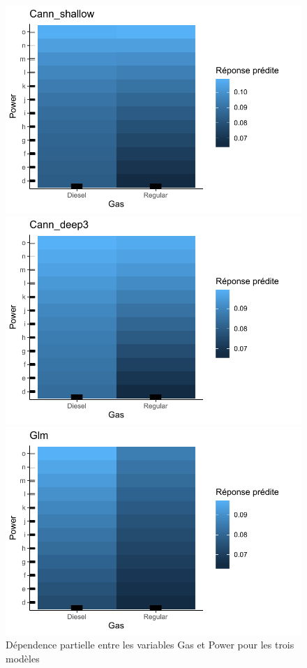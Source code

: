 \begin{figure}[b]
\caption{\label{fig:inter3GasPower} Dépendence partielle entre les variables Gas et Power pour les trois modèles}
\centering
\begin{minipage}{0.45\linewidth}
\includegraphics[scale=0.6]{Graphiques/interGasPowerShallow}
\end{minipage}
\hfill
\begin{minipage}{0.45\linewidth}
\includegraphics[scale=0.6]{Graphiques/interGasPowerCann}
\end{minipage}
\hfill
\begin{minipage}{0.45\linewidth}
\includegraphics[scale=0.6]{Graphiques/interGasPowerglm}

\end{minipage}
\end{figure}
